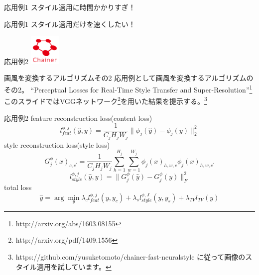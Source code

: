 \documentclass[12pt, unicode]{beamer}
\begin{document}
\begin{frame}{応用例1}
\Large{スタイル適用に時間かかりすぎ！}
\end{frame}

\begin{frame}{応用例1}
\Large{スタイル適用だけを速くしたい！}
\end{frame}

\begin{frame}{応用例2}
\includegraphics[clip,width=1.5cm]{image/chainer_logo.png}
\begin{block}{画風を変換するアルゴリズムその2}
応用例として画風を変換するアルゴリズムのその2。
``Perceptual Losses for Real-Time Style Transfer and Super-Resolution''\footnote[frame]{http://arxiv.org/abs/1603.08155}
このスライドではVGGネットワーク\footnote[frame]{http://arxiv.org/pdf/1409.1556}を用いた結果を提示する。\footnote[frame]{https://github.com/yusuketomoto/chainer-fast-neuralstyle に従って画像のスタイル適用を試しています。}
\end{block}
\end{frame}

\begin{frame}{応用例2}
feature reconstruction loss(content loss)
\begin{equation}
l_{feat}^{\phi,j}(\hat{y},y)=\frac{1}{C_{j}H_{j}W_{j}}\|\phi_{j} (\hat{y})-\phi_{j}(y)\|_{2}^{2}
\end{equation}
style reconstruction loss(style loss)
\begin{equation}
G_{j}^{\phi}(x)_{c,c^{\prime}}=\frac{1}{C_{j}H_{j}W_{j}}\sum_{h=1}^{H_{j}}\sum_{w=1}^{W_{j}}\phi_{j}(x)_{h,w,c}\phi_{j}(x)_{h,w,c^{\prime}}
\end{equation}
\begin{equation}
l_{style}^{\phi,j}(\hat{y},y)=\|G_{j}^{\phi}(\hat{y})-G_{j}^{\phi}(y)\|_{F}^{2}
\end{equation}
total loss
\begin{equation}
\hat{y}=\arg \min_{y}\lambda_{c}l_{feat}^{\phi,j}(y,y_{c})+\lambda_{s}l_{style}^{\phi,J}(y,y_{s})+\lambda_{TV}l_{TV}(y)
\end{equation}
\end{frame}
\end{document}
